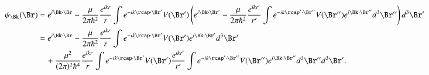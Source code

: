 \begin{equation}\label{eqn:qmTwoL25:290}
\begin{aligned}
\psi_\Bk(\Br) 
&=
e^{i \Bk \cdot \Br} - \frac{\mu}{2 \pi \hbar^2} \frac{ e^{i k r}}{r} \int e^{-i k \rcap \cdot \Br'} V(\Br') \left( 
e^{i \Bk \cdot \Br'} - \frac{\mu}{2 \pi \hbar^2} \frac{ e^{i k r'}}{r'} \int e^{-i k \rcap' \cdot \Br''} V(\Br'') e^{i \Bk \cdot \Br''} d^3 \Br''
\right) d^3 \Br' \\
&=
e^{i \Bk \cdot \Br} - \frac{\mu}{2 \pi \hbar^2} \frac{ e^{i k r}}{r} \int e^{-i k \rcap \cdot \Br'} V(\Br') e^{i \Bk \cdot \Br'} d^3 \Br' \\
&\quad +\frac{\mu^2}{(2 \pi)^2 \hbar^4}
\frac{ e^{i k r}}{r} 
\int e^{-i k \rcap \cdot \Br'} V(\Br') 
\frac{ e^{i k r'}}{r'} \int e^{-i k \rcap' \cdot \Br''} V(\Br'') e^{i \Bk \cdot \Br''} d^3 \Br'' d^3 \Br'.
\end{aligned}
\end{equation}

\EndArticle
